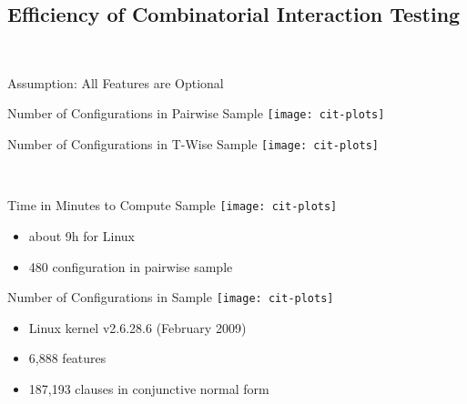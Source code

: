 \subsection{Efficiency of Combinatorial Interaction Testing}
\begin{frame}{\myframetitle\ \mytitlesource{\icpl}}
	\begin{exampletight}{Assumption: All Features are Optional}
		\centering\footnotesize\featureDiagramEightOptionalFeatures
	\end{exampletight}

	\pause
	\begin{mycolumns}
		\begin{exampletight}{Number of Configurations in Pairwise Sample}
			\texttt{[image: cit-plots]}
		\end{exampletight}
	\mynextcolumn
		\pause
		\begin{exampletight}{Number of Configurations in T-Wise Sample}
			\texttt{[image: cit-plots]}
		\end{exampletight}
	\end{mycolumns}
\end{frame}

\begin{frame}{\myframetitle\ \mytitlesource{\icpl}}
	\begin{mycolumns}[forget]
		\begin{exampletight}{Time in Minutes to Compute Sample}
			\texttt{[image: cit-plots]}

			\begin{itemize}
				\setlength\itemsep{.5em}
				\item about 9h for Linux
				\item 480 configuration in pairwise sample
			\end{itemize}
		\end{exampletight}
	\mynextcolumn
		\begin{exampletight}{Number of Configurations in Sample}
			\texttt{[image: cit-plots]}

			\begin{itemize}
				\setlength\itemsep{.5em}
				\item Linux kernel v2.6.28.6 (February 2009)
				\item 6,888 features
				\item 187,193 clauses in conjunctive normal form
			\end{itemize}
		\end{exampletight}
	\end{mycolumns}
\end{frame}

